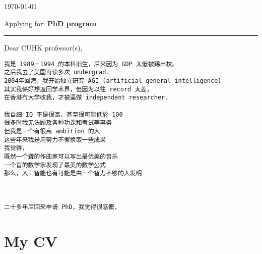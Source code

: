 
\today

{\small Applying for: \textbf{PhD program}}

\begin{center}
	\rule{0.8\textwidth}{1pt}
\end{center}

Dear CUHK professor(s),

\begin{verbatim}
我是 1989－1994 的本科旧生，后来因为 GDP 太低被踢出校。 
之后我去了美国再读多次 undergrad. 
2004年回港，我开始独立研究 AGI (artificial general intelligence) 
其实我係好想返回学术界，但因为以往 record 太差，
在香港冇大学收我，才被逼做 independent researcher.

我自细 IQ 不是很高，甚至很可能低於 100
很多时我无法顾及各种功课和考试等事务
但我是一个有很高 ambition 的人
这些年来我是用努力不懈换取一些成果
我觉得，
既然一个聋的作曲家可以写出最优美的音乐
一个盲的数学家发现了最美的数学公式
那么，人工智能也有可能是由一个智力不够的人发明



二十多年后回来申请 PhD，我觉得很感慨，

\end{verbatim}

\section*{My CV}

